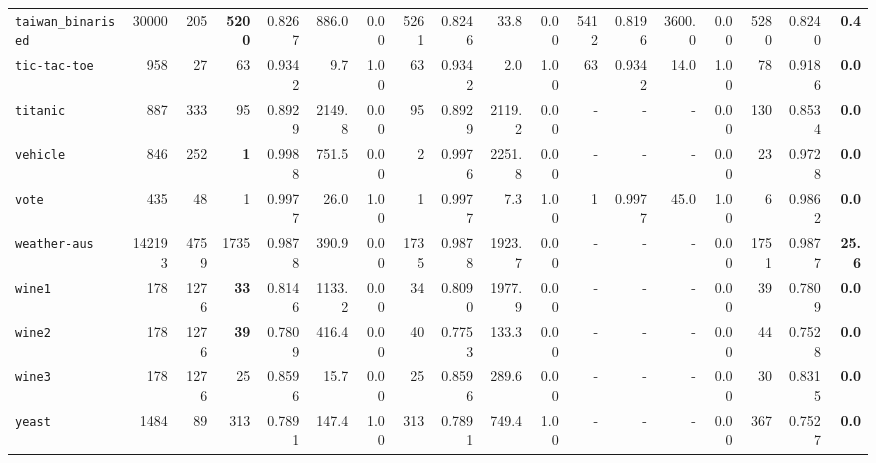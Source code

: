 \begin{tabular}{lccrrrrrrrrrrrrrrr}
\texttt{taiwan\_binarised} & \multicolumn{1}{r}{30000} & \multicolumn{1}{r}{205}  & \textbf{5200} & 0.8267 & 886.0 & 0.00 & 5261 & 0.8246 & 33.8 & 0.00 & 5412 & 0.8196 & 3600.0 & 0.00 & 5280 & 0.8240 & \textbf{0.4}\\
\texttt{tic-tac-toe} & \multicolumn{1}{r}{958} & \multicolumn{1}{r}{27}  & 63 & 0.9342 & 9.7 & 1.00 & 63 & 0.9342 & 2.0 & 1.00 & 63 & 0.9342 & 14.0 & 1.00 & 78 & 0.9186 & \textbf{0.0}\\
\texttt{titanic} & \multicolumn{1}{r}{887} & \multicolumn{1}{r}{333}  & 95 & 0.8929 & 2149.8 & 0.00 & 95 & 0.8929 & 2119.2 & 0.00 & - & - & - & 0.00 & 130 & 0.8534 & \textbf{0.0}\\
\texttt{vehicle} & \multicolumn{1}{r}{846} & \multicolumn{1}{r}{252}  & \textbf{1} & 0.9988 & 751.5 & 0.00 & 2 & 0.9976 & 2251.8 & 0.00 & - & - & - & 0.00 & 23 & 0.9728 & \textbf{0.0}\\
\texttt{vote} & \multicolumn{1}{r}{435} & \multicolumn{1}{r}{48}  & 1 & 0.9977 & 26.0 & 1.00 & 1 & 0.9977 & 7.3 & 1.00 & 1 & 0.9977 & 45.0 & 1.00 & 6 & 0.9862 & \textbf{0.0}\\
\texttt{weather-aus} & \multicolumn{1}{r}{142193} & \multicolumn{1}{r}{4759}  & 1735 & 0.9878 & 390.9 & 0.00 & 1735 & 0.9878 & 1923.7 & 0.00 & - & - & - & 0.00 & 1751 & 0.9877 & \textbf{25.6}\\
\texttt{wine1} & \multicolumn{1}{r}{178} & \multicolumn{1}{r}{1276}  & \textbf{33} & 0.8146 & 1133.2 & 0.00 & 34 & 0.8090 & 1977.9 & 0.00 & - & - & - & 0.00 & 39 & 0.7809 & \textbf{0.0}\\
\texttt{wine2} & \multicolumn{1}{r}{178} & \multicolumn{1}{r}{1276}  & \textbf{39} & 0.7809 & 416.4 & 0.00 & 40 & 0.7753 & 133.3 & 0.00 & - & - & - & 0.00 & 44 & 0.7528 & \textbf{0.0}\\
\texttt{wine3} & \multicolumn{1}{r}{178} & \multicolumn{1}{r}{1276}  & 25 & 0.8596 & 15.7 & 0.00 & 25 & 0.8596 & 289.6 & 0.00 & - & - & - & 0.00 & 30 & 0.8315 & \textbf{0.0}\\
\texttt{yeast} & \multicolumn{1}{r}{1484} & \multicolumn{1}{r}{89}  & 313 & 0.7891 & 147.4 & 1.00 & 313 & 0.7891 & 749.4 & 1.00 & - & - & - & 0.00 & 367 & 0.7527 & \textbf{0.0}\\
\bottomrule
\end{tabular}

